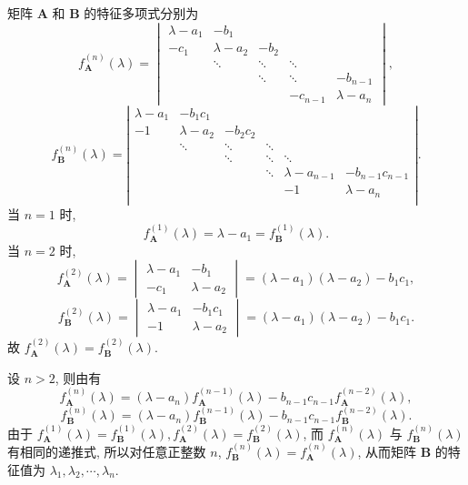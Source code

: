 \documentclass[../../main.tex]{subfiles}%
\begin{document}
\begin{solution}
矩阵 \(\boldsymbol{A}\) 和 \(\boldsymbol{B}\) 的特征多项式分别为
\[
f_{\boldsymbol{A}}^{(n)}(\lambda) = \begin{vmatrix} \lambda - a_1 & -b_1 \\ -c_1 & \lambda - a_2 & -b_2 \\ & \ddots & \ddots & \ddots \\ & & \ddots & \ddots & -b_{n - 1} \\ & & & -c_{n - 1} & \lambda - a_n \end{vmatrix},
\]
\[
f_{\boldsymbol{B}}^{(n)}(\lambda) = \left| \begin{matrix}
\lambda -a_1&		-b_1c_1&		&		&		&		\\
-1&		\lambda -a_2&		-b_2c_2&		&		&		\\
&		\ddots&		\ddots&		\ddots&		&		\\
&		&		\ddots&		\ddots&		\ddots&		\\
&		&		&		\ddots&		\lambda -a_{n-1}&		-b_{n-1}c_{n-1}\\
&		&		&		&		-1&		\lambda -a_n\\
\end{matrix} \right|.
\]
当 \(n = 1\) 时,
\[
f_{\boldsymbol{A}}^{(1)}(\lambda) = \lambda - a_1 = f_{\boldsymbol{B}}^{(1)}(\lambda).
\]
当 \(n = 2\) 时,
\[
f_{\boldsymbol{A}}^{(2)}(\lambda) = \begin{vmatrix} \lambda - a_1 & -b_1 \\ -c_1 & \lambda - a_2 \end{vmatrix} = (\lambda - a_1)(\lambda - a_2) - b_1c_1,
\]
\[
f_{\boldsymbol{B}}^{(2)}(\lambda) = \begin{vmatrix} \lambda - a_1 & -b_1c_1 \\ -1 & \lambda - a_2 \end{vmatrix} = (\lambda - a_1)(\lambda - a_2) - b_1c_1.
\]
故 \(f_{\boldsymbol{A}}^{(2)}(\lambda) = f_{\boldsymbol{B}}^{(2)}(\lambda)\).

设 \(n > 2\), 则由有
\[
f_{\boldsymbol{A}}^{(n)}(\lambda) = (\lambda - a_n)f_{\boldsymbol{A}}^{(n - 1)}(\lambda) - b_{n - 1}c_{n - 1}f_{\boldsymbol{A}}^{(n - 2)}(\lambda),
\]
\[
f_{\boldsymbol{B}}^{(n)}(\lambda) = (\lambda - a_n)f_{\boldsymbol{B}}^{(n - 1)}(\lambda) - b_{n - 1}c_{n - 1}f_{\boldsymbol{B}}^{(n - 2)}(\lambda).
\]
由于 \(f_{\boldsymbol{A}}^{(1)}(\lambda) = f_{\boldsymbol{B}}^{(1)}(\lambda), f_{\boldsymbol{A}}^{(2)}(\lambda) = f_{\boldsymbol{B}}^{(2)}(\lambda)\), 而 \(f_{\boldsymbol{A}}^{(n)}(\lambda)\) 与 \(f_{\boldsymbol{B}}^{(n)}(\lambda)\) 有相同的递推式, 所以对任意正整数 \(n\), \(f_{\boldsymbol{B}}^{(n)}(\lambda) = f_{\boldsymbol{A}}^{(n)}(\lambda)\), 从而矩阵 \(\boldsymbol{B}\) 的特征值为 \(\lambda_1, \lambda_2, \cdots, \lambda_n\).

\end{solution}
\end{document}
